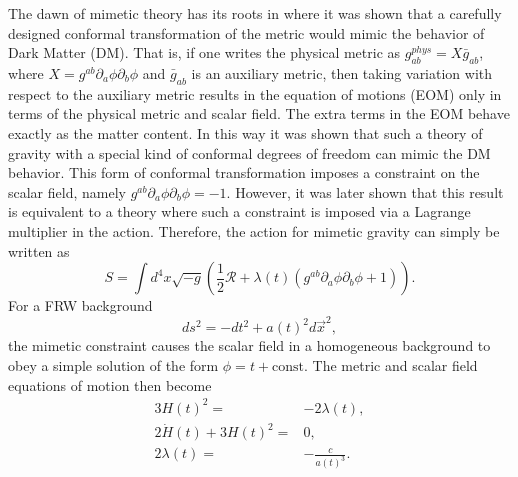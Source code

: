 \documentclass[%
 reprint,
 amsmath,amssymb,
 aps,
]{revtex4-1}
\begin{document}
The dawn of mimetic theory has its roots in \cite{Chamseddine:2013kea} where it was shown that a carefully designed  conformal transformation of the metric would mimic the behavior of Dark Matter (DM). That is, if one writes the physical metric as $g_{ab}^{phys}=X \bar{g}_{ab}$, where $X=g^{ab}\partial{_a}\phi\partial{_b}\phi$ and $\bar{g}_{ab}$ is an auxiliary metric, then taking variation with respect to the auxiliary metric results in the equation of motions (EOM) only in terms of the physical metric and scalar field. The extra terms in the EOM behave exactly as the matter content. In this way it was shown that such a theory of gravity with a special kind of conformal degrees of freedom can mimic the DM behavior. This form of conformal transformation imposes a constraint on the scalar field, namely $g^{ab}\partial_a\phi\partial_b\phi=-1$. However, it was later shown that \cite{Golovnev:2013jxa} this result is equivalent to a theory where such a constraint is imposed via a Lagrange multiplier in the action. Therefore, the action for mimetic gravity can simply be written as
\begin{equation}
S=\int d^4x \sqrt{-g}\left(\frac{1}{2} \mathcal{R}+\lambda(t)(g^{ab}\partial_a\phi\partial_b\phi+1)\right).
\end{equation}
For a FRW background
\begin{equation}
ds^2=-dt^2+a(t)^2 d\vec{x}^2,
\end{equation}
the mimetic constraint causes the scalar field in a homogeneous background to obey a simple solution of the form $\phi=t+\mbox{const}$. The metric and scalar field equations of motion then become
\begin{eqnarray}\label{mimeom}
3 H(t)^2=&-2\lambda(t),\\ \label{eq:tt}
2\dot{H}(t)+3H(t)^2=&0,\\ \label{eq:ii}
2\lambda(t)=&-\frac{c}{a(t)^3}.
\end{eqnarray}
\end{document}
